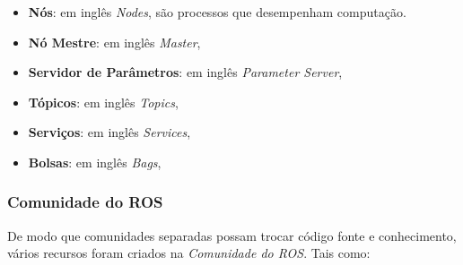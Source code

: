                 \begin{itemize}
                    \item \textbf{Nós}: em inglês \textit{Nodes}, são processos que desempenham computação. 
                    
                    \item \textbf{Nó Mestre}: em inglês \textit{Master},
                    
                    \item \textbf{Servidor de Parâmetros}: em inglês \textit{Parameter Server},
                    
                    \item \textbf{Tópicos}: em inglês \textit{Topics},
                    
                    \item \textbf{Serviços}: em inglês \textit{Services},
                    
                    \item \textbf{Bolsas}: em inglês \textit{Bags},
                \end{itemize}
            
            \subsubsection{Comunidade do ROS}
        
                De modo que comunidades separadas possam trocar código fonte e conhecimento, vários recursos foram criados na \textit{Comunidade do ROS}. Tais como:
                
